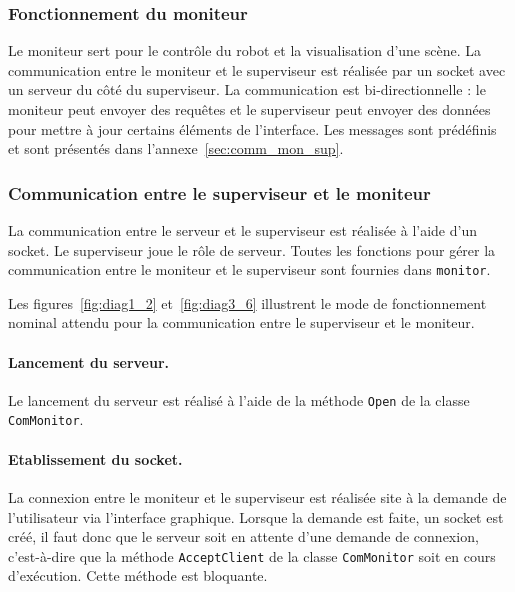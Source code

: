 \subsubsection{Fonctionnement du moniteur}

Le moniteur sert pour le contrôle du robot et la visualisation d'une scène. La communication entre le moniteur et le superviseur est réalisée par un socket avec un serveur du côté du superviseur. La communication est bi-directionnelle : le moniteur peut envoyer des requêtes et le superviseur peut envoyer des données pour mettre à jour certains éléments de l'interface. Les messages sont prédéfinis et sont présentés dans l'annexe~\ref{sec:comm_mon_sup}.


  \subsubsection{Communication entre le superviseur et le moniteur}

La communication entre le serveur et le superviseur est réalisée à l'aide d'un socket. Le superviseur joue le rôle de serveur. Toutes les fonctions pour gérer la communication entre le moniteur et le superviseur sont fournies dans {\tt monitor}.

Les figures~\ref{fig:diag1_2} et~\ref{fig:diag3_6}  illustrent le mode de fonctionnement nominal attendu pour la communication entre le superviseur et le moniteur.


\paragraph{Lancement du serveur.} Le lancement du serveur est réalisé à l'aide de la méthode {\tt Open} de la classe {\tt ComMonitor}.\\



\paragraph{Etablissement du socket.} La connexion entre le moniteur et le superviseur est réalisée site à la demande de l'utilisateur via l'interface graphique. Lorsque la demande est faite, un socket est créé, il faut donc que le serveur soit en attente d'une demande de connexion, c'est-à-dire que la méthode {\tt AcceptClient} de la classe {\tt ComMonitor} soit en cours d'exécution. Cette méthode est bloquante.\\


